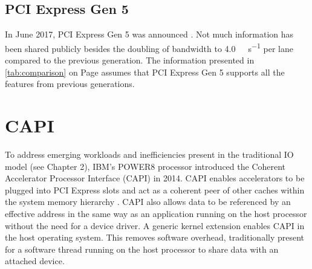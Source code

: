 \subsection{PCI Express Gen 5}
In June 2017, PCI Express Gen 5 was announced \cite{pcie5}. Not much information has been shared publicly besides the doubling of bandwidth to \SI{4.0}{\giga\byte\per\second} per lane compared to the previous generation. The information presented in \autoref{tab:comparison} on Page \pageref{tab:comparison} assumes that PCI Express Gen 5 supports all the features from previous generations.





\section{CAPI}
To address emerging workloads and inefficiencies present in the traditional IO model (see Chapter 2), IBM's POWER8 processor introduced the Coherent Accelerator Processor Interface (CAPI) in 2014. CAPI enables accelerators to be plugged into PCI Express slots and act as a coherent peer of other caches within the system memory hierarchy \cite{capi_ibm}. CAPI also allows data to be referenced by an effective address in the same way as an application running on the host processor without the need for a device driver. A generic kernel extension enables CAPI in the host operating system. This removes software overhead, traditionally present for a software thread running on the host processor to share data with an attached device.



